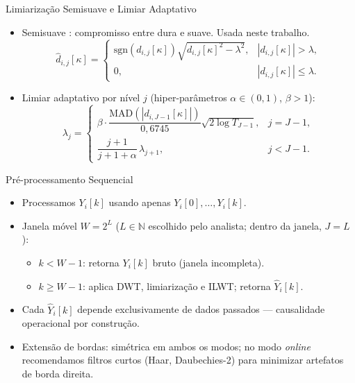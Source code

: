 \documentclass{beamer}
\begin{document}
\begin{frame}{Limiarização Semisuave e Limiar Adaptativo}
\begin{itemize}
    \item Semisuave \cite{liu_improved_2014}: compromisso entre dura e suave. Usada neste trabalho.
    \[
        \hat{d}_{i,j}[\kappa] = \begin{cases}
            \mathrm{sgn}(d_{i,j}[\kappa])\sqrt{d_{i,j}[\kappa]^2 - \lambda^2}, & |d_{i,j}[\kappa]| > \lambda, \\
            0, & |d_{i,j}[\kappa]| \leqslant \lambda.
        \end{cases}
    \]
    \item Limiar adaptativo por nível \(j\) (hiper-parâmetros \(\alpha \in (0,1)\), \(\beta > 1\)):
    \[
        \lambda_j = \begin{cases}
            \beta \cdot \dfrac{\mathrm{MAD}(|d_{i,J-1}[\kappa]|)}{0{,}6745}\sqrt{2\log T_{J-1}}, & j = J-1, \\[4pt]
            \dfrac{j+1}{j+1+\alpha}\,\lambda_{j+1}, & j < J-1.
        \end{cases}
    \]
\end{itemize}
\end{frame}

\begin{frame}{Pré-processamento Sequencial}
\begin{itemize}
    \item Processamos \(Y_i[k]\) usando apenas \(Y_i[0], \ldots, Y_i[k]\).
    \item Janela móvel \(W = 2^L\) (\(L \in \mathbb{N}\) escolhido pelo analista; dentro da janela, \(J = L\)):
    \begin{itemize}
        \item \(k < W-1\): retorna \(Y_i[k]\) bruto (janela incompleta).
        \item \(k \geq W-1\): aplica DWT, limiarização e ILWT; retorna \(\hat{Y}_i[k]\).
    \end{itemize}
    \item Cada \(\hat{Y}_i[k]\) depende exclusivamente de dados passados — causalidade operacional por construção.
    \item Extensão de bordas: simétrica em ambos os modos; no modo \textit{online} recomendamos filtros curtos (Haar, Daubechies-2) para minimizar artefatos de borda direita.
\end{itemize}
\end{frame}

\end{document}
